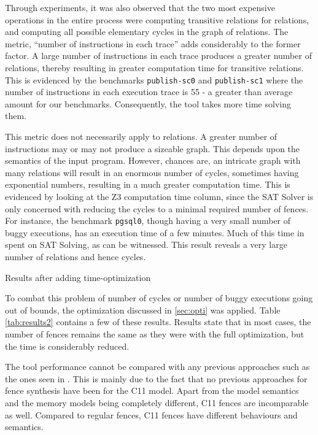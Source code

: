 Through experiments, it was also observed that the two most expensive 
operations in the entire process were computing transitive relations for \lhb
relations, and computing all possible elementary cycles in the graph of \lto
relations. The metric, ``number of instructions in each trace'' adds
considerably to the former factor. A large number of instructions in each
trace produces a greater number of \lhb relations, thereby resulting in
greater computation time for transitive relations. This is evidenced by the benchmarks
\texttt{publish-sc0} and \texttt{publish-sc1} where the number of instructions in each
execution trace is 55 - a greater than average amount for our benchmarks.
Consequently, the tool takes more time solving them.

This metric does not necessarily apply to \lto relations.
A greater number of instructions may or may not produce a sizeable \lto graph.
This depends upon the semantics of the input program. However, chances are,
an intricate graph with many \lto relations will result in an enormous number of cycles, 
sometimes having exponential numbers, resulting in a much greater
computation time. This is evidenced by looking at the Z3 computation 
time column, since the SAT Solver is only concerned with reducing the cycles
to a minimal required number of fences. For instance, the benchmark \texttt{pgsql0}, though having 
a very small number of buggy executions, has an execution time of a few minutes. Much
of this time in spent on SAT Solving, as can be witnessed. This result reveals 
a very large number of \lto relations and hence cycles.

\begin{table}
\begin{center}
	
	\caption{Results after adding time-optimization}
	\label{tab:results2}
\end{center}
\end{table}

To combat this problem of number of cycles or number of buggy executions going out of bounds,
the optimization discussed in \ref{sec:opti} was applied.
Table \ref{tab:results2} contains a few of these results. Results state that
in most cases, the number of fences remains the same as they were with the 
full optimization, but the time is considerably reduced.

The tool performance cannot be compared with any previous approaches such as
the ones seen in \cite{ref1, ref2, etc}. This is mainly due to the fact that
no previous approaches for fence synthesis have been for the C11 model. Apart
from the model semantics and the memory models being completely different,
C11 fences are incomparable as well. Compared to regular fences, C11 fences have
different behaviours and semantics.

